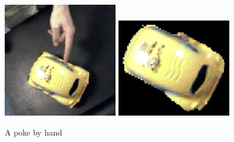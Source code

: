 \begin{figure}[tbh]
  \centerline{
\includegraphics[width=5cm]{fig-car-hand-seg-src}
\hspace{1cm}
\includegraphics[width=5cm]{fig-car-hand-seg}
}
  \caption{A poke by hand}
  \label{fig:handpoke}
\end{figure}

